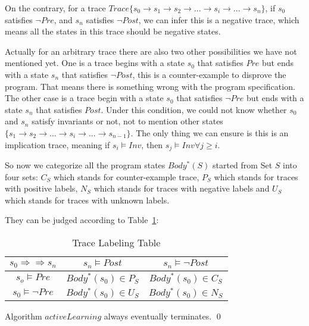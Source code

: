 On the contrary, for a trace $Trace\{s_0 \to s_1 \to s_2 \to ...\to s_i \to ... \to s_n\}$, 
if $s_0$ satisfies $\neg Pre$, and $s_n$ satisfies $\neg Post$,
we can infer this is a negative trace, 
which means all the states in this trace should be negative states.  

Actually for an arbitrary trace there are also two other possibilities we have not mentioned yet.
One is a trace begins with a state $s_0$ that satisfies $Pre$ but ends with a state $s_n$ that satisfies $\neg Post$,
this is a counter-example to disprove the program.
That means there is something wrong with the program specification.
The other case is a trace begin with a state $s_0$ that satisfies $\neg Pre$ but ends with a state $s_n$ that satisfies $Post$.
Under this condition, we could not know whether $s_0$ and $s_n$ satisfy invariants or not,
not to mention other states $\{s_1 \to s_2 \to ... \to s_i \to ... \to s_{n-1}\}$.
The only thing we can ensure is this is an implication trace, meaning if $s_i \models Inv$, then $s_j \models Inv \forall j \ge i$.


So now we categorize all the program states $Body^*(S)$ started from Set $S$ into four sets:
$C_{S}$ which stands for counter-example trace, 
$P_{S}$ which stands for traces with positive labels, 
$N_{S}$ which stands for traces with negative labels 
and $U_{S}$ which stands for traces with unknown labels.

They can be judged according to Table~\ref{LabelingTable}: 
\begin{table}[htb]
\label{LabelingTable}
\centering
\caption{Trace Labeling Table}
\begin{tabular}[float]{|c|c|c|}
\hline
$s_0 \Rightarrow \Rightarrow s_n$ & $s_n \models Post$            & $s_n \models \neg Post$\\
\hline
$s_o \models Pre$                 & $Body^*(s_0) \in P_{S}$       & $Body^*(s_0) \in C_{S}$\\
\hline
$s_0 \models \neg Pre$            & $Body^*(s_0) \in U_{S}$       & $Body^*(s_0) \in N_{S}$\\
\hline
\end{tabular}
\end{table}










\begin{example}
\end{example}

\begin{proposition}
Algorithm $activeLearning$ always eventually terminates. \hfill \qed
\end{proposition}


\begin{example}
\end{example}


